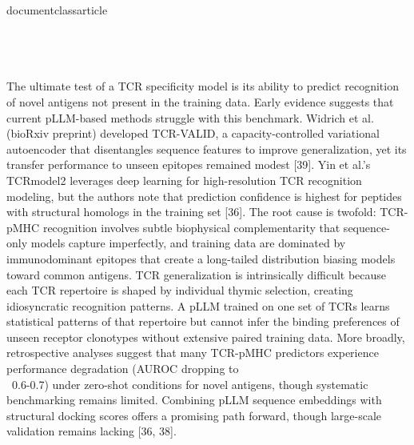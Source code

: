\\documentclass{article}
\begin{document}
\subsection{}

The ultimate test of a TCR specificity model is its ability to predict recognition of novel antigens not present in the training data. Early evidence suggests that current pLLM-based methods struggle with this benchmark. Widrich et al. (bioRxiv preprint) developed TCR-VALID, a capacity-controlled variational autoencoder that disentangles sequence features to improve generalization, yet its transfer performance to unseen epitopes remained modest [39]. Yin et al.'s TCRmodel2 leverages deep learning for high-resolution TCR recognition modeling, but the authors note that prediction confidence is highest for peptides with structural homologs in the training set [36]. The root cause is twofold: TCR-pMHC recognition involves subtle biophysical complementarity that sequence-only models capture imperfectly, and training data are dominated by immunodominant epitopes that create a long-tailed distribution biasing models toward common antigens. TCR generalization is intrinsically difficult because each TCR repertoire is shaped by individual thymic selection, creating idiosyncratic recognition patterns. A pLLM trained on one set of TCRs learns statistical patterns of that repertoire but cannot infer the binding preferences of unseen receptor clonotypes without extensive paired training data. More broadly, retrospective analyses suggest that many TCR-pMHC predictors experience performance degradation (AUROC dropping to \\~0.6-0.7) under zero-shot conditions for novel antigens, though systematic benchmarking remains limited. Combining pLLM sequence embeddings with structural docking scores offers a promising path forward, though large-scale validation remains lacking [36, 38].

\section{}

\subsection{}
\end{document}
